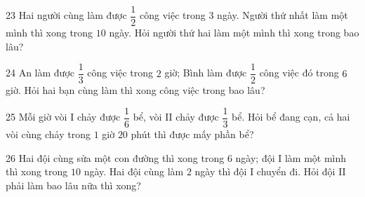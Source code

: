 \gap
\begin{probbox}{23}{\relax}
Hai người cùng làm được $\dfrac12$ công việc trong $3$ ngày. Người thứ nhất làm một mình thì xong trong $10$ ngày. Hỏi người thứ hai làm một mình thì xong trong bao lâu?
\end{probbox}
\gap
\begin{probbox}{24}{\relax}
An làm được $\dfrac13$ công việc trong $2$ giờ; Bình làm được $\dfrac12$ công việc đó trong $6$ giờ. Hỏi hai bạn cùng làm thì xong công việc trong bao lâu?
\end{probbox}
\gap
\begin{probbox}{25}{\relax}
Mỗi giờ vòi I chảy được $\dfrac16$ bể, vòi II chảy được $\dfrac13$ bể. Hỏi bể đang cạn, cả hai vòi cùng chảy trong $1$ giờ $20$ phút thì được mấy phần bể?
\end{probbox}
\gap
\begin{probbox}{26}{\relax}
Hai đội cùng sửa một con đường thì xong trong $6$ ngày; đội I làm một mình thì xong trong $10$ ngày. Hai đội cùng làm $2$ ngày thì đội I chuyển đi. Hỏi đội II phải làm bao lâu nữa thì xong?
\end{probbox}
